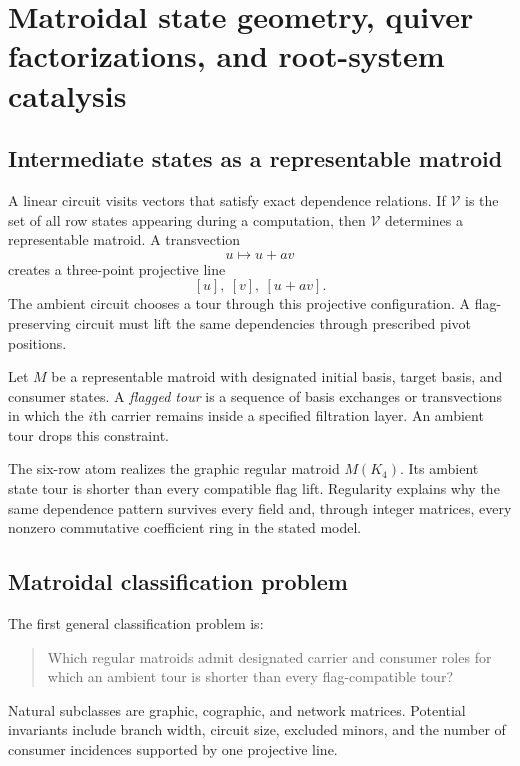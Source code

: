 \chapter{Matroidal state geometry, quiver factorizations, and root-system catalysis}\label{ch:matroid-quiver-roots}


\section{Intermediate states as a representable matroid}
A linear circuit visits vectors that satisfy exact dependence relations.  If $\mathcal V$ is the set of all row states appearing during a computation, then $\mathcal V$ determines a representable matroid.  A transvection
\[
u\longmapsto u+a v
\]
creates a three-point projective line
\[
[u],\ [v],\ [u+av].
\]
The ambient circuit chooses a tour through this projective configuration.  A flag-preserving circuit must lift the same dependencies through prescribed pivot positions.

\begin{definition}
Let $M$ be a representable matroid with designated initial basis, target basis, and consumer states.  A \emph{flagged tour} is a sequence of basis exchanges or transvections in which the $i$th carrier remains inside a specified filtration layer.  An ambient tour drops this constraint.
\end{definition}
The six-row atom realizes the graphic regular matroid $M(K_4)$.  Its ambient state tour is shorter than every compatible flag lift.  Regularity explains why the same dependence pattern survives every field and, through integer matrices, every nonzero commutative coefficient ring in the stated model.

\section{Matroidal classification problem}
The first general classification problem is:
\begin{quote}
Which regular matroids admit designated carrier and consumer roles for which an ambient tour is shorter than every flag-compatible tour?
\end{quote}
Natural subclasses are graphic, cographic, and network matrices.  Potential invariants include branch width, circuit size, excluded minors, and the number of consumer incidences supported by one projective line.

